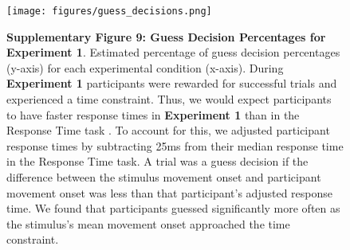 \documentclass[man,floatsintext,letterpaper,12pt]{apa7}
\newcommand\boldblue[1]{\textcolor{mydarkblue}{\textbf{#1}}}
\begin{document}
\begin{figure}[H]
    \centering
    \texttt{[image: figures/guess\_decisions.png]}

    \caption*{\boldblue{Supplementary Figure 9: Guess Decision Percentages for Experiment 1}. 
    Estimated percentage of guess decision percentages (y-axis) for each experimental condition (x-axis). During \boldblue{Experiment 1} participants were rewarded for successful trials and experienced a time constraint. Thus, we would expect participants to have faster response times in \boldblue{Experiment 1} than in the Response Time task \autocite{milsteinInfluenceExpectedValue2007,shadmehrMovementVigorReflection2019a}. To account for this, we adjusted participant response times by subtracting 25ms from their median response time in the Response Time task. A trial was a guess decision if the difference between the stimulus movement onset and participant movement onset was less than that participant’s adjusted response time. We found that participants guessed significantly more often as the stimulus’s mean movement onset approached the time constraint.}
\end{figure}

\newpage
\begin{nolinenumbers}
    \printbibliography[title={Supplementary References}]
\end{nolinenumbers}
\end{document}
